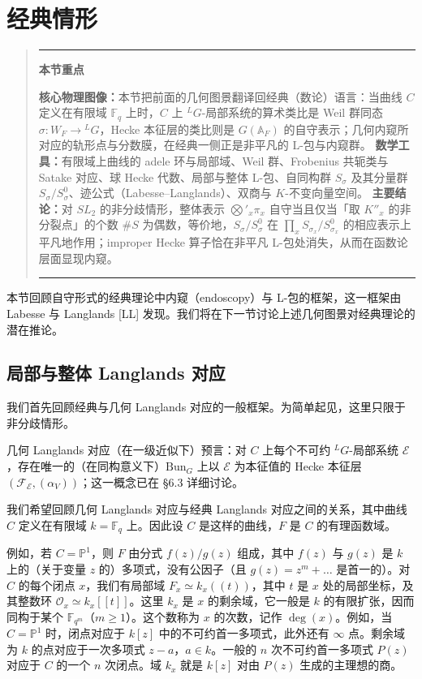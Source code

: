 \documentclass[11pt,a4paper]{article}
\newenvironment{keytakeaway}
  {\par\medskip\begin{quote}\small\noindent
   \rule{\linewidth}{0.6pt}\par\nopagebreak\smallskip\noindent
   \textbf{本节重点}\par\nobreak\smallskip\noindent\ignorespaces}
  {\par\smallskip\noindent\rule{\linewidth}{0.6pt}\end{quote}\medskip}
\newcommand{\Bun}{\mathrm{Bun}}
\begin{document}

\section{经典情形}

\begin{keytakeaway}
\textbf{核心物理图像：}本节把前面的几何图景翻译回经典（数论）语言：当曲线 $C$ 定义在有限域 $\mathbb{F}_q$ 上时，$C$ 上 ${}^{L}G$-局部系统的算术类比是 Weil 群同态 $\sigma:W_F\to{}^{L}G$，Hecke 本征层的类比则是 $G(\mathbb{A}_F)$ 的自守表示；几何内窥所对应的轨形点与分数膜，在经典一侧正是非平凡的 L-包与内窥群。
\textbf{数学工具：}有限域上曲线的 adele 环与局部域、Weil 群、Frobenius 共轭类与 Satake 对应、球 Hecke 代数、局部与整体 L-包、自同构群 $S_\sigma$ 及其分量群 $S_\sigma/S_\sigma^0$、迹公式（Labesse--Langlands）、双商与 $K$-不变向量空间。
\textbf{主要结论：}对 $SL_2$ 的非分歧情形，整体表示 $\bigotimes'_{x}\pi_x$ 自守当且仅当「取 $K''_x$ 的非分裂点」的个数 $\#S$ 为偶数，等价地，$S_\sigma/S_\sigma^0$ 在 $\prod_x S_{\sigma_x}/S_{\sigma_x}^0$ 的相应表示上平凡地作用；improper Hecke 算子恰在非平凡 L-包处消失，从而在函数论层面显现内窥。
\end{keytakeaway}

本节回顾自守形式的经典理论中内窥（endoscopy）与 L-包的框架，这一框架由 Labesse 与 Langlands [LL] 发现。我们将在下一节讨论上述几何图景对经典理论的潜在推论。

\subsection{局部与整体 Langlands 对应}

我们首先回顾经典与几何 Langlands 对应的一般框架。为简单起见，这里只限于非分歧情形。

几何 Langlands 对应（在一级近似下）预言：对 $C$ 上每个不可约 ${}^{L}G$-局部系统 $\mathcal{E}$，存在唯一的（在同构意义下）$\Bun_G$ 上以 $\mathcal{E}$ 为本征值的 Hecke 本征层 $(\mathcal{F}_{\mathcal{E}},(\alpha_V))$；这一概念已在 §6.3 详细讨论。

我们希望回顾几何 Langlands 对应与经典 Langlands 对应之间的关系，其中曲线 $C$ 定义在有限域 $k=\mathbb{F}_q$ 上。因此设 $C$ 是这样的曲线，$F$ 是 $C$ 的有理函数域。

例如，若 $C=\mathbb{P}^1$，则 $F$ 由分式 $f(z)/g(z)$ 组成，其中 $f(z)$ 与 $g(z)$ 是 $k$ 上的（关于变量 $z$ 的）多项式，没有公因子（且 $g(z)=z^m+\ldots$ 是首一的）。对 $C$ 的每个闭点 $x$，我们有局部域 $F_x\simeq k_x((t))$，其中 $t$ 是 $x$ 处的局部坐标，及其整数环 $\mathcal{O}_x\simeq k_x[[t]]$。这里 $k_x$ 是 $x$ 的剩余域，它一般是 $k$ 的有限扩张，因而同构于某个 $\mathbb{F}_{q^m}$（$m\geq 1$）。这个数称为 $x$ 的次数，记作 $\deg(x)$。例如，当 $C=\mathbb{P}^1$ 时，闭点对应于 $k[z]$ 中的不可约首一多项式，此外还有 $\infty$ 点。剩余域为 $k$ 的点对应于一次多项式 $z-a$，$a\in k$。一般的 $n$ 次不可约首一多项式 $P(z)$ 对应于 $C$ 的一个 $n$ 次闭点。域 $k_x$ 就是 $k[z]$ 对由 $P(z)$ 生成的主理想的商。
\end{document}
